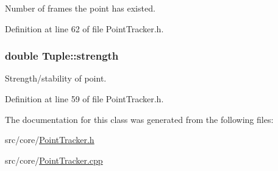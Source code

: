 \-Number of frames the point has existed. 



\-Definition at line 62 of file \-Point\-Tracker.\-h.

\hypertarget{class_tuple_aa2e3ef0462fe1ffb96028cbe5f8324c9}{
\subsubsection[{strength}]{\setlength{\rightskip}{0pt plus 5cm}double {\bf \-Tuple\-::strength}}}
\label{class_tuple_aa2e3ef0462fe1ffb96028cbe5f8324c9}


\-Strength/stability of point. 



\-Definition at line 59 of file \-Point\-Tracker.\-h.



\-The documentation for this class was generated from the following files\-:\begin{DoxyCompactItemize}
\item 
src/core/\hyperlink{_point_tracker_8h}{\-Point\-Tracker.\-h}\item 
src/core/\hyperlink{_point_tracker_8cpp}{\-Point\-Tracker.\-cpp}\end{DoxyCompactItemize}
